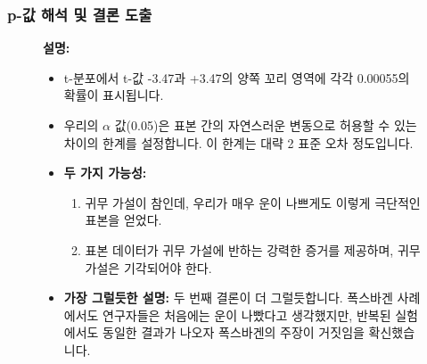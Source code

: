 \documentclass[11pt,a4paper]{article}
\theoremstyle{definition}
\begin{document}
\subsubsection*{p-값 해석 및 결론 도출}

\begin{figure}[h!]
    \centering
    \label{fig:p_value_interpretation}
    \vspace{0.5em}
    \textbf{설명:}
    \begin{itemize}
        \item t-분포에서 t-값 -3.47과 +3.47의 양쪽 꼬리 영역에 각각 0.00055의 확률이 표시됩니다.
        \item 우리의 $\alpha$ 값(0.05)은 표본 간의 자연스러운 변동으로 허용할 수 있는 차이의 한계를 설정합니다. 이 한계는 대략 2 표준 오차 정도입니다.
        \item \textbf{두 가지 가능성:}
            \begin{enumerate}
                \item 귀무 가설이 참인데, 우리가 매우 운이 나쁘게도 이렇게 극단적인 표본을 얻었다.
                \item 표본 데이터가 귀무 가설에 반하는 강력한 증거를 제공하며, 귀무 가설은 기각되어야 한다.
            \end{enumerate}
        \item \textbf{가장 그럴듯한 설명:} 두 번째 결론이 더 그럴듯합니다. 폭스바겐 사례에서도 연구자들은 처음에는 운이 나빴다고 생각했지만, 반복된 실험에서도 동일한 결과가 나오자 폭스바겐의 주장이 거짓임을 확신했습니다.
    \end{itemize}
\end{figure}
\end{document}
